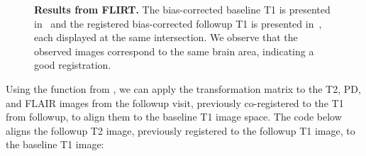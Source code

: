 \begin{figure}
\hfill
\caption{{\bf Results from FLIRT.} The bias-corrected baseline T1 is presented in~\protect{} and the registered bias-corrected followup T1 is presented in~\protect{}, each displayed at the same intersection. We observe that the observed images correspond to the same brain area, indicating a good registration. }
\label{fig:flirt}
\end{figure}


Using the  function from , we can apply the transformation matrix to the T2, PD, and FLAIR images from the followup visit, previously co-registered to the T1 from followup, to align them to the baseline T1 image space.  The code below aligns the followup T2 image, previously registered to the followup T1 image, to the baseline T1 image:


\begin{knitrout}
\color{fgcolor}\begin{kframe}
\begin{alltt}
\hlstd{(} \hlstd{=} \hlstd{,} 
             \hlstd{=} \hlstd{,} 
             \hlstd{=} \hlstd{,} 
             \hlstd{=}  
            \hlstd{)}
\end{alltt}
\end{kframe}
\end{knitrout}



